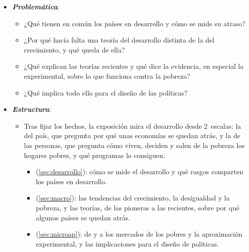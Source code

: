 \documentclass[11pt]{article}
\begin{document}
\begin{itemize}
\item \textbf{\emph{Problemática}}:
  \begin{itemize}
  \item ¿Qué tienen en común los países en desarrollo y cómo se mide su atraso?
  \item ¿Por qué hacía falta una teoría del desarrollo distinta de la del crecimiento, y qué queda de ella?
  \item ¿Qué explican las teorías recientes y qué dice la evidencia, en especial la experimental, sobre lo que funciona contra la pobreza?
  \item ¿Qué implica todo ello para el diseño de las políticas?
  \end{itemize}

\item \textbf{\emph{Estructura}}:
  \begin{itemize}
  \item Tras fijar los hechos, la exposición mira el desarrollo desde 2~escalas: la del país, que pregunta por qué unas economías se quedan atrás, y la de las personas, que pregunta cómo viven, deciden y salen de la pobreza los hogares pobres, y qué programas lo consiguen.
  \begin{itemize}
  \item {} (\ref{sec:desarrollo}): cómo se mide el desarrollo y qué rasgos comparten los países en desarrollo.
  \item {} (\ref{sec:macro}): las tendencias del crecimiento, la desigualdad y la pobreza, y las teorías, de las pioneras a las recientes, sobre por qué algunos países se quedan atrás.
  \item {} (\ref{sec:microap}): de  y  a los mercados de los pobres y la aproximación experimental, y las implicaciones para el diseño de políticas.
  \end{itemize}
  \end{itemize}
\end{itemize}
\end{document}
